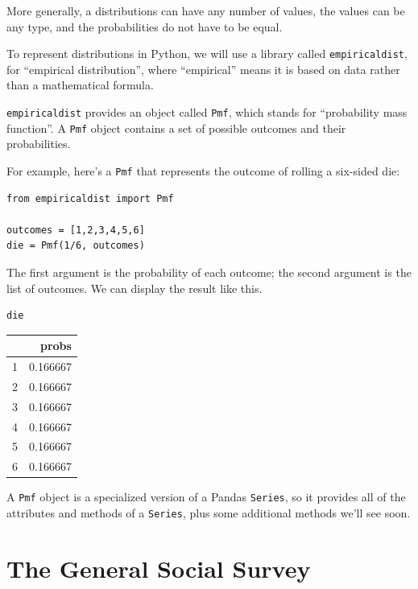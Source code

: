 More generally, a distributions can have any number of values, the
values can be any type, and the probabilities do not have to be equal.

To represent distributions in Python, we will use a library called
\passthrough{\lstinline!empiricaldist!}, for ``empirical distribution'',
where ``empirical'' means it is based on data rather than a mathematical
formula.

\passthrough{\lstinline!empiricaldist!} provides an object called
\passthrough{\lstinline!Pmf!}, which stands for ``probability mass
function''. A \passthrough{\lstinline!Pmf!} object contains a set of
possible outcomes and their probabilities.

For example, here's a \passthrough{\lstinline!Pmf!} that represents the
outcome of rolling a six-sided die:

\begin{lstlisting}[]
from empiricaldist import Pmf

outcomes = [1,2,3,4,5,6]
die = Pmf(1/6, outcomes)
\end{lstlisting}

The first argument is the probability of each outcome; the second
argument is the list of outcomes. We can display the result like this.

\begin{lstlisting}[]
die
\end{lstlisting}

\begin{tabular}{lr}
\midrule
{} &     probs \\
\midrule
1 &  0.166667 \\
2 &  0.166667 \\
3 &  0.166667 \\
4 &  0.166667 \\
5 &  0.166667 \\
6 &  0.166667 \\
\midrule
\end{tabular}

A \passthrough{\lstinline!Pmf!} object is a specialized version of a
Pandas \passthrough{\lstinline!Series!}, so it provides all of the
attributes and methods of a \passthrough{\lstinline!Series!}, plus some
additional methods we'll see soon.

\hypertarget{the-general-social-survey}{%
\section{The General Social Survey}\label{the-general-social-survey}}

